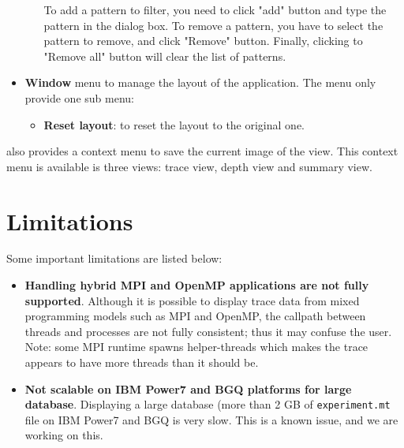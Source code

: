 \begin{itemize}
\begin{itemize}
To add a pattern to filter, you need to click "add" button and type the pattern in the dialog box. To remove a pattern, you have to select the pattern to remove, and click "Remove" button. Finally, clicking to "Remove all" button will clear the list of patterns.
 \end{itemize}
 \item \textbf{Window} menu to manage the layout of the application. The menu only provide one sub menu:
 \begin{itemize}
  \item \textbf{Reset layout}: to reset the layout to the original one.
 \end{itemize}
\end{itemize}

\hpctraceviewer{} also provides a context menu to save the current image of the view. 
This context menu is available is three views: trace view, depth view and summary view.




\section{Limitations}

Some important \hpctraceviewer{} limitations are listed below:
\begin{itemize}

\item \textbf{Handling hybrid MPI and OpenMP applications are not fully supported}.
	Although it is possible to display trace data from mixed programming models such as MPI and OpenMP, the callpath between threads and processes are not fully consistent; thus it may confuse the user. Note: some MPI runtime spawns helper-threads which makes the trace appears to have more threads than it should be.

\item \textbf{Not scalable on IBM Power7 and BGQ platforms for large database}.
	Displaying a large database (more than 2 GB of \texttt{experiment.mt} file on IBM Power7 and BGQ is very slow. This is a known issue, and we are working on this.


\end{itemize}
